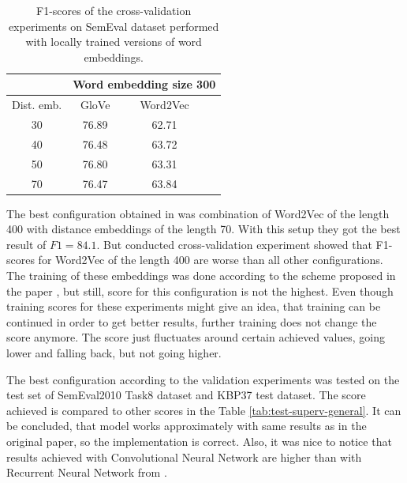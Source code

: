 \begin{table}
        \centering
        \begin{tabular}{|c|c|c|c|}
          \hline
            & \multicolumn{3}{|c|}{Word embedding size 300} \\\hline
            Dist. emb. & GloVe & Word2Vec  \\\hline
            \multicolumn{1}{|c|}{30} & 76.89 & 62.71 \\\hline
            \multicolumn{1}{|c|}{40} & 76.48 & 63.72 \\\hline
            \multicolumn{1}{|c|}{50} & 76.80 & 63.31 \\\hline
            \multicolumn{1}{|c|}{70} & 76.47 & 63.84 \\\hline
        \end{tabular}
        \caption[Cross-validation for the general domain on locally trained embeddings]{F1-scores of the cross-validation experiments on SemEval dataset performed with locally trained versions of word embeddings.}
        \label{tab:local-val-semeval}
    \end{table}

 The best configuration obtained in \cite{DBLP:journals/corr/SantosXZ15} was combination of Word2Vec of the length 400 with distance embeddings of the length 70. With this setup they got the best result of $F1=84.1$. But conducted cross-validation experiment showed that F1-scores for Word2Vec 
of the length 400 are worse than all other configurations. The training of these embeddings was done 
according to the scheme proposed in the paper \cite{DBLP:journals/corr/SantosXZ15}, but 
still, score for this configuration is not the highest. Even though training scores for 
these experiments might give an idea, that training can be continued in order to get better 
results, further training does not change the score anymore. The score just fluctuates around 
certain achieved values, going lower and falling back, but not going higher.

The best configuration according to the validation experiments was tested on the test set of 
SemEval2010 Task8 dataset and KBP37 test dataset. The score achieved is compared to other scores in the Table 
\ref{tab:test-superv-general}. It can be concluded, that model works approximately with same 
results as in the original paper, so the implementation is correct. Also, it was nice to notice that 
results achieved with Convolutional Neural Network are higher than with Recurrent Neural Network from 
\cite{DBLP:journals/corr/ZhangW15a}.

